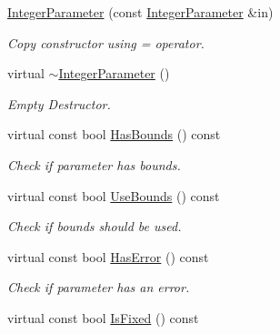 \begin{DoxyCompactItemize}
\hyperlink{class_integer_parameter_a4601b4b1d68bac1e0a599324e3c5b1fb}{Integer\-Parameter} (const \hyperlink{class_integer_parameter}{Integer\-Parameter} \&in)
\begin{DoxyCompactList}\small\item\em Copy constructor using = operator. \end{DoxyCompactList}\item 
virtual \hyperlink{class_integer_parameter_a66cbb6a345278f86c5af0fdb2961aa95}{$\sim$\-Integer\-Parameter} ()
\begin{DoxyCompactList}\small\item\em Empty Destructor. \end{DoxyCompactList}\item 
\hypertarget{class_integer_parameter_a321225fbd82f3d272af0b0785c293014}{virtual const bool \hyperlink{class_integer_parameter_a321225fbd82f3d272af0b0785c293014}{Has\-Bounds} () const }\label{class_integer_parameter_a321225fbd82f3d272af0b0785c293014}

\begin{DoxyCompactList}\small\item\em Check if parameter has bounds. \end{DoxyCompactList}\item 
\hypertarget{class_integer_parameter_a2fa6e3a0cb1c288b8dd3d37860b6dea1}{virtual const bool \hyperlink{class_integer_parameter_a2fa6e3a0cb1c288b8dd3d37860b6dea1}{Use\-Bounds} () const }\label{class_integer_parameter_a2fa6e3a0cb1c288b8dd3d37860b6dea1}

\begin{DoxyCompactList}\small\item\em Check if bounds should be used. \end{DoxyCompactList}\item 
\hypertarget{class_integer_parameter_abbd590feb425e997ff3bd635c2708ef8}{virtual const bool \hyperlink{class_integer_parameter_abbd590feb425e997ff3bd635c2708ef8}{Has\-Error} () const }\label{class_integer_parameter_abbd590feb425e997ff3bd635c2708ef8}

\begin{DoxyCompactList}\small\item\em Check if parameter has an error. \end{DoxyCompactList}\item 
\hypertarget{class_integer_parameter_ae5779fb4971fce0b087b2b601ba1d6ea}{virtual const bool \hyperlink{class_integer_parameter_ae5779fb4971fce0b087b2b601ba1d6ea}{Is\-Fixed} () const }\label{class_integer_parameter_ae5779fb4971fce0b087b2b601ba1d6ea}


\end{DoxyCompactItemize}
